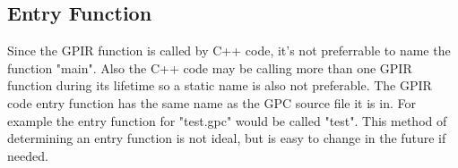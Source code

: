 \subsection{Entry Function}
Since the GPIR function is called by C++ code, it's not preferrable to name the function "main".
Also the C++ code may be calling more than one GPIR function during its lifetime so a static
name is also not preferable. The GPIR code entry function has the same name as the GPC source
file it is in. For example the entry function  for "test.gpc" would be called "test". This method
of determining an entry function is not ideal, but is easy to change in the future if needed.





